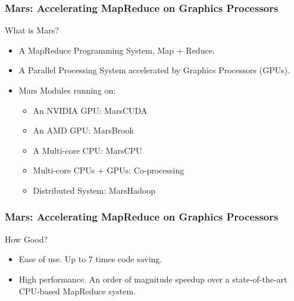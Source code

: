 \begin{frame}
\frametitle{Mars: Accelerating MapReduce on Graphics Processors}
\vspace{-4em}
What is Mars?
\begin{itemize}
\item<1-> A MapReduce Programming System, Map + Reduce.
\item<2-> A Parallel Processing System accelerated by Graphics Processors (GPUs).
\item<3-> Mars Modules running on:
\begin{itemize}
\item<3-> An NVIDIA GPU: \alert{MarsCUDA} 
\item<4-> An AMD GPU: \alert{MarsBrook}
\item<5-> A Multi-core CPU: \alert{MarsCPU}
\item<6-> Multi-core CPUs + GPUs: \alert{Co-processing}
\item<7-> Distributed System: \alert{MarsHadoop}
\end{itemize}
\end{itemize}
\end{frame}

\begin{frame}
\frametitle{Mars: Accelerating MapReduce on Graphics Processors}
\vspace{-4em}
How Good?
\begin{itemize}
\item Ease of use. Up to \alert{7 times} code saving.
\item High performance. \alert{An order of magnitude} speedup over a state-of-the-art CPU-based MapReduce system.
\end{itemize}
\end{frame}
